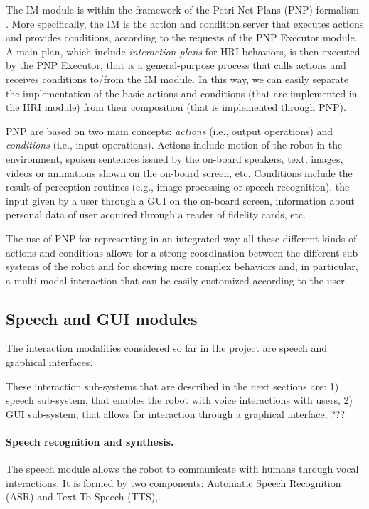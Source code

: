 The IM module is within the framework of the Petri Net Plans (PNP) formalism \cite{}. More specifically, the IM is the action and condition server that executes actions and provides conditions, according to the requests of the PNP Executor module.
A main plan, which include \emph{interaction plans} for HRI behaviors, is then executed by the PNP Executor, that is a general-purpose process that calls actions and receives conditions to/from the IM module.
In this way, we can easily separate the implementation of the basic actions and conditions (that are implemented in the HRI module) from their composition (that is implemented through PNP). 


PNP are based on two main concepts: \emph{actions} (i.e., output operations) and \emph{conditions} (i.e., input operations). Actions include motion of the robot in the environment, spoken sentences issued by the on-board speakers, text, images, videos or animations shown on the on-board screen, etc.
Conditions include the result of perception routines (e.g., image processing or speech recognition), the input given by a user through a GUI on the on-board screen, information about personal data of user acquired through a reader of fidelity cards, etc.

The use of PNP for representing in an integrated way all these different kinds of actions and conditions allows for a strong coordination between the different sub-systems of the robot and for showing more complex behaviors and, in particular, a multi-modal interaction that can be easily customized according to the user.



\subsection{Speech and GUI modules}

The interaction modalities considered so far in the project are speech and graphical interfaces.

These interaction sub-systems that are described in the next sections are: 1) speech sub-system, that enables the robot with voice interactions with users, 2) GUI sub-system, that allows for interaction through a graphical interface, ???


\paragraph{Speech recognition and synthesis.}
The speech module allows the robot to communicate with humans through vocal interactions. 
It  is formed by two components: Automatic Speech Recognition (ASR) and Text-To-Speech (TTS),.

